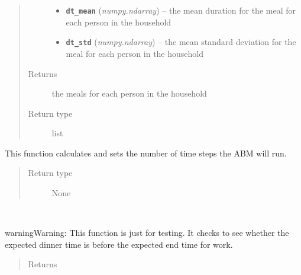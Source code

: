 \documentclass[letterpaper,10pt,english]{sphinxmanual}
\begin{document}
\begin{fulllineitems}
\begin{fulllineitems}
\begin{quote}
\begin{description}
\begin{itemize}
\item {} 
\textbf{\texttt{dt\_mean}} (\emph{numpy.ndarray}) -- the mean duration for the meal for each person in the household

\item {} 
\textbf{\texttt{dt\_std}} (\emph{numpy.ndarray}) -- the mean standard deviation for the meal for each person in the household

\end{itemize}

\item[{Returns}] \leavevmode
the meals for each person in the household

\item[{Return type}] \leavevmode
list

\end{description}\end{quote}

\end{fulllineitems}


\begin{fulllineitems}
\label{params:params.Params.set_num_steps}
This function calculates and sets the number of time steps the ABM will run.
\begin{quote}\begin{description}
\item[{Return type}] \leavevmode
None

\end{description}\end{quote}

\end{fulllineitems}


\begin{fulllineitems}
\label{params:params.Params.tester}~
\begin{notice}{warning}{Warning:}
This function is just for testing. It checks to see whether the expected dinner time is before             the expected end time for work.
\end{notice}
\begin{quote}\begin{description}
\item[{Returns}] \leavevmode


\end{description}\end{quote}


\end{fulllineitems}
\end{fulllineitems}
\end{document}
